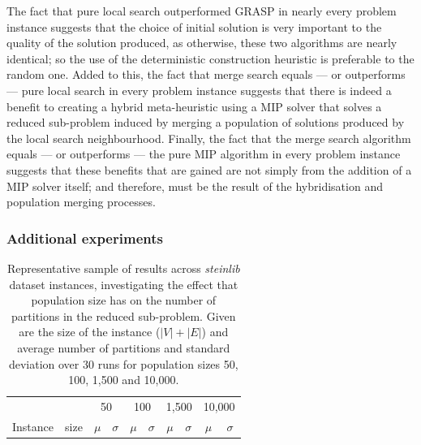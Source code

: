 \documentclass[journal]{IEEEtran}
\begin{document}
The fact that pure local search outperformed GRASP in nearly every problem instance suggests that the choice of initial solution is very important to the quality of the solution produced, as otherwise, these two algorithms are nearly identical; so the use of the deterministic construction heuristic is preferable to the random one. Added to this, the fact that merge search equals --- or outperforms --- pure local search in every problem instance suggests that there is indeed a benefit to creating a hybrid meta-heuristic using a MIP solver that solves a reduced sub-problem induced by merging a population of solutions produced by the local search neighbourhood. Finally, the fact that the merge search algorithm equals --- or outperforms --- the pure MIP algorithm in every problem instance suggests that these benefits that are gained are not simply from the addition of a MIP solver itself; and therefore, must be the result of the hybridisation and population merging processes.

\subsubsection*{Additional experiments}
\begin{table}[t!]
\centering
\caption[Size of reduced sub-problem results]{Representative sample of results across \emph{steinlib} dataset instances, investigating the effect that population size has on the number of partitions in the reduced sub-problem. Given are the size of the instance (\(|V|+|E|\)) and average number of partitions and standard deviation over 30 runs for population sizes 50, 100, 1,500 and 10,000.}\label{tab:stpg:pop:trunc} 
\begin{adjustbox}{width=0.45\textwidth}
\begin{tabular}{lrrrrrrrrr} \toprule
 &  & \multicolumn{2}{c}{50} & \multicolumn{2}{c}{100} & \multicolumn{2}{c}{1,500} & \multicolumn{2}{c}{10,000}\\
\cmidrule(lr){3-4} \cmidrule(lr){5-6} \cmidrule(lr){7-8} \cmidrule(lr){9-10} 
Instance & size & \multicolumn{1}{c}{\(\mu\)}&\multicolumn{1}{c}{\(\sigma\)} & \multicolumn{1}{c}{\(\mu\)}&\multicolumn{1}{c}{\(\sigma\)}& \multicolumn{1}{c}{\(\mu\)}&\multicolumn{1}{c}{\(\sigma\)} & \multicolumn{1}{c}{\(\mu\)}&\multicolumn{1}{c}{\(\sigma\)}\\ \midrule
%

%
\bottomrule
\end{tabular}
\end{adjustbox}
\end{table}
\end{document}
